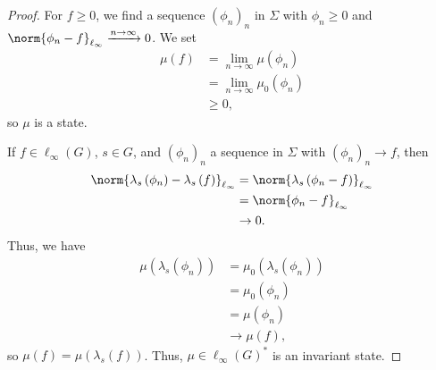 \begin{proof}
  For $f\geq 0$, we find a sequence $\left(\phi_n\right)_n$ in $\Sigma$ with $\phi_n\geq 0$ and $\norm{\phi_n - f}_{\ell_{\infty}} \xrightarrow{n\rightarrow\infty}0$. We set
  \begin{align*}
    \mu\left(f\right) &= \lim_{n\rightarrow\infty}\mu\left(\phi_n\right)\\
                      &= \lim_{n\rightarrow\infty}\mu_0\left(\phi_n\right)\\
                      &\geq 0,
  \end{align*}
  so $\mu$ is a state.\newline

  If $f\in \ell_{\infty}\left(G\right)$, $s\in G$, and $\left(\phi_n\right)_n$ a sequence in $\Sigma$ with $\left(\phi_n\right)_n\rightarrow f$, then
  \begin{align*}
    \norm{\lambda_s\left(\phi_n\right) - \lambda_s\left(f\right)}_{\ell_{\infty}} &= \norm{\lambda_s\left(\phi_n - f\right)}_{\ell_{\infty}}\\
                                                                                  &= \norm{\phi_n - f}_{\ell_{\infty}}\\
                                                                  &\rightarrow 0.
  \end{align*}
  Thus, we have
  \begin{align*}
    \mu\left(\lambda_s\left(\phi_n\right)\right) &= \mu_0\left(\lambda_s\left(\phi_n\right)\right)\\
                                                 &= \mu_0\left(\phi_n\right)\\
                                                 &= \mu\left(\phi_n\right)\\
                                                 &\rightarrow \mu\left(f\right),
  \end{align*}
  so $\mu\left(f\right) = \mu\left(\lambda_s\left(f\right)\right)$. Thus, $\mu\in \ell_{\infty}\left(G\right)^{\ast}$ is an invariant state.
\end{proof}
